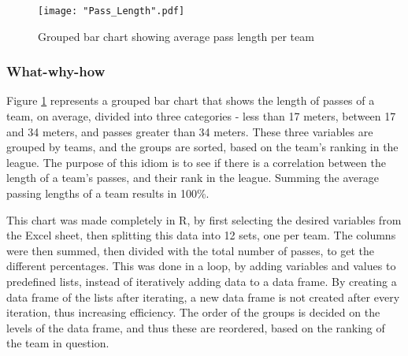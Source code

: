 \documentclass[Report.tex]{subfiles}
\begin{document}
\begin{figure}
\center
\texttt{[image: "Pass\_Length".pdf]}
\caption{Grouped bar chart showing average pass length per team}
\label{Fig:Pass_Length}
\end{figure}



\subsubsection{What-why-how}
Figure \ref{Fig:Pass_Length} represents a grouped bar chart that shows the length of passes of a team, on average,
divided into three categories - less than 17 meters, between 17 and 34 meters,
and passes greater than 34 meters. These three variables are grouped by teams,
and the groups are sorted, based on the team's ranking in the league.
The purpose of this idiom is to see if there is a correlation between the length
of a team's passes, and their rank in the league.
Summing the average passing lengths of a team results in 100\%. 

This chart was made completely in R, by first selecting the desired variables
from the Excel sheet, then splitting this data into 12 sets, one per team. 
The columns were then summed, then divided with the total number of passes, to
get the different percentages. This was done in a loop, by adding variables and
values to predefined lists, instead of iteratively adding data to a data frame. 
By creating a data frame of the lists after iterating,
a new data frame is not created after every iteration, thus increasing
efficiency.
The order of the groups is decided on the levels of the data frame, and
thus these are reordered, based on the ranking of the team in question.
\end{document}
